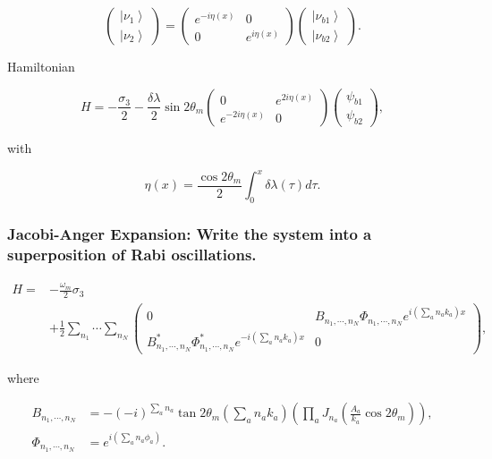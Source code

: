 \documentclass[%
preprint,
 amsmath,amssymb,
 aps,
]{revtex4-1}
\newcommand{\ket}[1]{\left| #1\right\rangle}
\begin{document}
\begin{equation}
\begin{pmatrix} \ket{\nu_1} \\ \ket{\nu_2} \end{pmatrix} = \begin{pmatrix} e^{-i \eta (x)} & 0 \\  0 & e^{i \eta (x)}  \end{pmatrix} \begin{pmatrix} \ket{\nu_{b1}} \\ \ket{\nu_{b2}} \end{pmatrix}.
\end{equation}

Hamiltonian

\begin{equation}
 H = -\frac{\sigma_3}{2} - \frac{\delta \lambda}{2} \sin 2\theta_m \begin{pmatrix} 0 & e^{2i\eta(x)} \\ e^{-2 i\eta(x) } & 0 \end{pmatrix}  \begin{pmatrix} \psi_{b1} \\ \psi_{b2} \end{pmatrix},
\end{equation}

with

\begin{equation}
 \eta(x) =  \frac{\cos 2\theta_m}{2} \int_0^x \delta\lambda (\tau) d\tau.
\end{equation}


\subsubsection{Jacobi-Anger Expansion: Write the system into a superposition of Rabi oscillations.}
    
    
\begin{align}
H =& -\frac{\omega_m}{2} \sigma_3 \nonumber \\
&+ \frac{1}{2} \sum_{n_1} \cdots \sum_{n_N} \begin{pmatrix} 0 & B_{n_1,\cdots,n_N} \Phi_{n_1,\cdots, n_N} e^{i \left( \sum_{a} n_a k_a   \right)x} \\ B_{n_1,\cdots,n_N}^* \Phi_{n_1,\cdots, n_N}^* e^{-i \left( \sum_{a} n_a k_a   \right)x} & 0 \end{pmatrix},
\end{align}

where

\begin{align}
B_{n_1,\cdots,n_N} &= -(-i)^{\sum_a n_a} \tan 2\theta_m \left( \sum_a n_a k_a \right) \left( \prod_a J_{n_a}\left( \frac{A_a}{k_a}\cos 2\theta_m \right) \right),\\
\Phi_{n_1,\cdots, n_N} &= e^{i\left( \sum_a n_a \phi_a \right)}.
\end{align}
\end{document}
